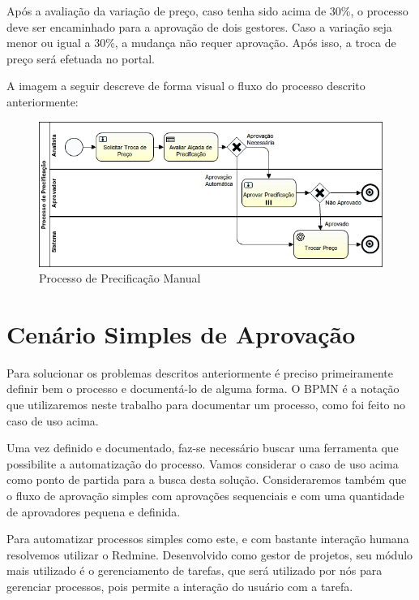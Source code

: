 Após a avaliação da variação de preço, caso tenha sido acima de 30\%, o processo deve ser encaminhado para a aprovação de dois gestores. Caso a variação seja menor ou igual a 30\%, a mudança não requer aprovação. Após isso, a troca de preço será efetuada no portal.

A imagem a seguir descreve de forma visual o fluxo do processo descrito anteriormente:

\begin{figure}[H]
  \centering
  \includegraphics[width=1.0\textwidth]{imagens/ProcessoDePrecificacao.png}
  \caption{Processo de Precificação Manual}
  \label{fig:exemplo_bpmn}
\end{figure}


\section{Cenário Simples de Aprovação}\label{sec:cenario-simples}

Para solucionar os problemas descritos anteriormente é preciso primeiramente definir bem o processo e documentá-lo de alguma forma. O BPMN é a notação que utilizaremos neste trabalho para documentar um processo, como foi feito no caso de uso acima.

Uma vez definido e documentado, faz-se necessário buscar uma ferramenta que possibilite a automatização do processo.
Vamos considerar o caso de uso acima como ponto de partida para a busca desta solução. Consideraremos também que o fluxo de aprovação simples com aprovações sequenciais e com uma quantidade de aprovadores pequena e definida.

Para automatizar processos simples como este, e com bastante interação humana resolvemos utilizar o Redmine. Desenvolvido como gestor de projetos, seu módulo mais utilizado é o gerenciamento de tarefas, que será utilizado por nós para gerenciar processos, pois permite a interação do usuário com a tarefa.


